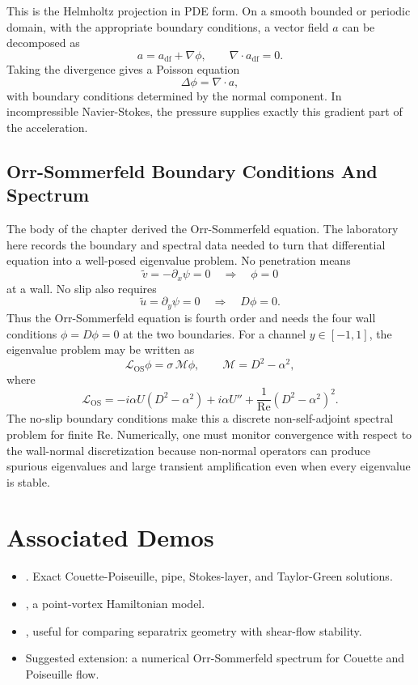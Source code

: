 This is the Helmholtz projection in PDE form. On a smooth bounded or periodic
domain, with the appropriate boundary conditions, a vector field \(a\) can be
decomposed as
\[
  a=a_{\mathrm{df}}+\nabla\phi,\qquad \nabla\cdot a_{\mathrm{df}}=0.
\]
Taking the divergence gives a Poisson equation
\[
  \Delta\phi=\nabla\cdot a,
\]
with boundary conditions determined by the normal component. In incompressible
Navier-Stokes, the pressure supplies exactly this gradient part of the
acceleration.

\subsection{Orr-Sommerfeld Boundary Conditions And Spectrum}
\label{sec:detailed-orr-sommerfeld}

The body of the chapter derived the Orr-Sommerfeld equation. The laboratory
here records the boundary and spectral data needed to turn that differential
equation into a well-posed eigenvalue problem. No penetration means
\[
  \tilde v=-\partial_x\psi=0
  \quad\Rightarrow\quad
  \phi=0
\]
at a wall. No slip also requires
\[
  \tilde u=\partial_y\psi=0
  \quad\Rightarrow\quad
  D\phi=0.
\]
Thus the Orr-Sommerfeld equation is fourth order and needs the four wall
conditions \(\phi=D\phi=0\) at the two boundaries.
For a channel \(y\in[-1,1]\), the eigenvalue problem may be written as
\[
  \mathcal L_{\mathrm{OS}}\phi=\sigma\,\mathcal M\phi,
  \qquad
  \mathcal M=D^2-\alpha^2,
\]
where
\[
  \mathcal L_{\mathrm{OS}}
  =
  -i\alpha U(D^2-\alpha^2)+i\alpha U''
  +\frac1{\mathrm{Re}}(D^2-\alpha^2)^2.
\]
The no-slip boundary conditions make this a discrete non-self-adjoint spectral
problem for finite \(\mathrm{Re}\). Numerically, one must monitor convergence
with respect to the wall-normal discretization because non-normal operators can
produce spurious eigenvalues and large transient amplification even when every
eigenvalue is stable.

\section{Associated Demos}
\label{sec:fluid-associated-demos}

\begin{itemize}
\item {}.
Exact Couette-Poiseuille, pipe, Stokes-layer, and Taylor-Green solutions.
\item {}, a point-vortex Hamiltonian model.
\item {}, useful for comparing
separatrix geometry with shear-flow stability.
\item Suggested extension: a numerical Orr-Sommerfeld spectrum for Couette and
Poiseuille flow.
\end{itemize}
